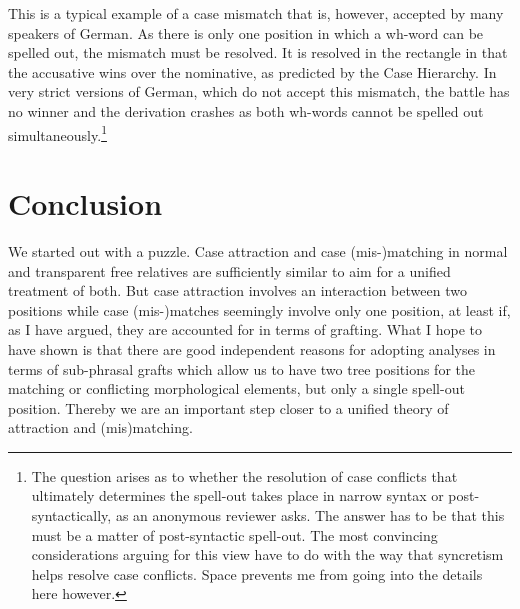 \documentclass[output=paper]{langsci/langscibook}
\begin{document}
\begin{refcontext}
This is a typical example of a case mismatch that is, however, accepted by many
speakers of German. As there is only one position in which a wh-word can be
spelled out, the mismatch must be resolved. It is resolved in the rectangle in
that the accusative wins over the nominative, as predicted by the Case
Hierarchy. In very strict versions of German, which do not accept this
mismatch, the battle has no winner and the derivation crashes as both
wh-words
cannot be spelled out simultaneously.\footnote{The question arises as to whether
the resolution of case conflicts that ultimately determines the spell-out takes
place in narrow syntax or post-syntactically, as an anonymous reviewer asks.
The answer has to be that this must be a matter of post-syntactic spell-out.
The most convincing considerations arguing for this view have to do with the
way that syncretism helps resolve case conflicts. Space prevents me from going
into the details here however.}\\

\section{Conclusion}

We started out with a puzzle. Case attraction and case (mis-)matching in normal
and transparent free relatives are sufficiently similar to aim for a unified
treatment of both. But case attraction involves an interaction between two
positions while case (mis-)matches seemingly involve only one position, at
least if, as I have argued, they are accounted for in terms of grafting. What
I hope to have shown is that there are good independent reasons for adopting
analyses in terms of sub-phrasal grafts which allow us to have two tree
positions for the matching or conflicting morphological elements, but only a
single spell-out position. Thereby we are an important step closer to a unified
theory of attraction and (mis)matching.

\printchapterglossary{}


{\sloppy
\printbibliography[heading=subbibliography,notkeyword=this]
}

\end{refcontext}
\end{document}
